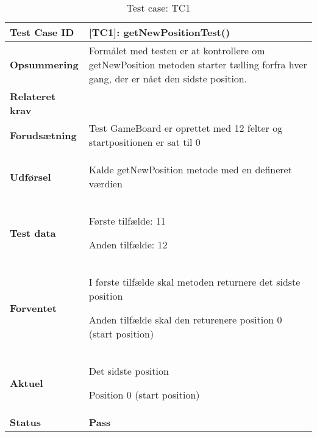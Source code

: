 \documentclass[class=article, crop=false]{standalone}
\begin{document}
    \begin{table}[H]
        \caption{Test case: TC1}
        \begin{tabularx}{\textwidth}{|l|X|}
            \hline
            \textbf{Test Case ID }       & \textbf{[TC1]: getNewPositionTest()}   \\ \hline
            \textbf{Opsummering}         & Formålet med testen er at kontrollere om getNewPosition
            metoden starter tælling forfra hver gang,
            der er nået den sidste position.\\ \hline
            \textbf{Relateret krav }     &      \\ \hline
            \textbf{Forudsætning}& Test GameBoard er oprettet med 12 felter og startpositionen er sat til 0\\ \hline
            \textbf{Udførsel}            & \begin{tabenum}
                                               \item Kalde getNewPosition metode med en defineret værdien
            \end{tabenum} \\ \hline
            \textbf{Test data}           & \begin{tabenum}
                                               \item Første tilfælde: 11
                                               \item Anden tilfælde: 12
            \end{tabenum}  \\ \hline
            \textbf{Forventet} & \begin{tabenum}
                                     \item I første tilfælde skal metoden returnere det sidste position
                                     \item Anden tilfælde skal den returenere position 0 (start position)
            \end{tabenum}  \\ \hline
            \textbf{Aktuel} & \begin{tabenum}
                                  \item Det sidste position
                                  \item Position 0 (start position)
            \end{tabenum}   \\ \hline
            \textbf{Status} & \textbf{Pass} \\ \hline

\end{tabularx}
\end{table}
\end{document}
